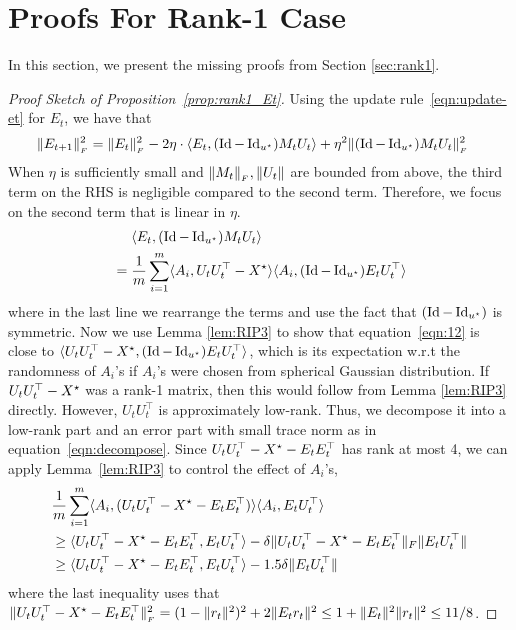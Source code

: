 \section{Proofs For Rank-1 Case}\label{sec_proof_rank1}

In this section, we present the missing proofs from Section \ref{sec:rank1}.

\begin{proof}[Proof Sketch of Proposition~\ref{prop:rank1_Et}]
Using the update rule~\eqref{eqn:update-et} for $E_t$, we have that 
\begin{align}
	\|E_{t+1}\|_{_{F}}^2
	&= \|E_t\|_{_{F}}^2 - 2\eta \cdot \langle E_t, (\operatorname{Id} - \operatorname{Id}_{{u^{\star}}}) M_t U_t\rangle
	+ \eta^2 \|(\operatorname{Id} - \operatorname{Id}_{{u^{\star}}}) M_t U_t\|_{_{F}}^2 \label{eq:rank1_Et_fro}
\end{align}
	When $\eta$ is sufficiently small and $\|M_t\|_{_{F}}, \|U_t\|$ are bounded from above, the third term on the RHS is negligible compared to the second term. Therefore, we focus on the second term that is linear in $\eta$. 
\begin{align}
	&\quad~ \langle E_t, (\operatorname{Id} - \operatorname{Id}_{{u^{\star}}}) M_t U_t\rangle \nonumber \\
	&= \frac 1 m \sum_{i=1}^m \langle A_i, U_t U_t^{\top} - {X}^\star\rangle \langle A_i, (\operatorname{Id} - \operatorname{Id}_{{u^{\star}}}) E_t U_t^{\top}\rangle \label{eqn:12}
\end{align}
	where in the last line we rearrange the terms and use the fact that $(\operatorname{Id} - \operatorname{Id}_{{u^{\star}}})$ is symmetric.
	Now we use Lemma \ref{lem:RIP3} to show that equation~\eqref{eqn:12} is close to 
	$\langle U_t U_t^{\top} - {X}^\star, (\operatorname{Id} - \operatorname{Id}_{{u^{\star}}}) E_t U_t^{\top}\rangle$, which is its expectation w.r.t the randomness of $A_i$'s if $A_i$'s were chosen from spherical Gaussian distribution.
	If $U_t U_t^{\top} - {X}^\star$ was a rank-1 matrix, then this would follow from Lemma \ref{lem:RIP3} directly. However, $U_tU_t^\top$ is approximately low-rank. Thus, we decompose it into a low-rank part and an error part with small trace norm as in equation~\eqref{eqn:decompose}. Since $U_t U_t^{\top} - {X}^\star - E_t E_t^{\top}$ has rank at most 4,  we can apply Lemma~\ref{lem:RIP3} to control the effect of $A_i$'s, 
	\begin{align}
& \frac 1 m \sum_{i=1}^m \langle A_i, (U_t U_t^{\top} - {X}^\star - E_t E_t^{\top})\rangle \langle A_i, E_t U_t^{\top}\rangle \nonumber\\
& \ge \langle U_t U_t^{\top} - {X}^\star - E_t E_t^{\top}, E_tU_t^\top \rangle - 	\delta \|U_t U_t^{\top} - {X}^\star - E_t E_t^{\top}\|_F \|E_t U_t^{\top}\|\nonumber \\
& \ge \langle U_t U_t^{\top} - {X}^\star - E_t E_t^{\top}, E_tU_t^\top \rangle - 	1.5\delta \|E_t U_t^{\top}\|\label{eqn:100}
	\end{align}
	where the last inequality uses that 	$\|U_t U_t^{\top} - {X}^\star - E_t E_t^{\top}\|_{_{F}}^2 = (1 - \|r_t\|^2)^2 + 2\|E_t r_t\|^2 \le 1 + \|E_t\|^2 \|r_t\|^2 \le 11/8$.
	

\end{proof}
